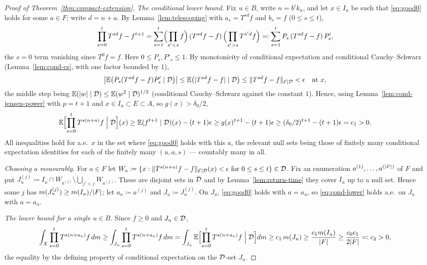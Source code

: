 \begin{proof}[Proof of Theorem~\ref{thm:compact-extension}]
  \emph{The conditional lower bound.}  Fix $u \in B$, write $n = b^ik_u$, and let
  $x \in I_u$ be such that \eqref{eq:good0} holds for some $a \in F$; write $d = n + a$.  By
  Lemma~\ref{lem:telescoping} with $a_s = T^{sd}f$ and $b_s = f$ ($0 \leq s \leq t$),
  \[
    \prod_{s=0}^{t} T^{sd}f - f^{t+1}
      = \sum_{s=1}^{t} \Bigl(\prod_{s'<s} f\Bigr)\,(T^{sd}f - f)\,\Bigl(\prod_{s'>s} T^{s'd}f\Bigr)
      \eqqcolon \sum_{s=1}^{t} P_s\,(T^{sd}f - f)\,P'_s ,
  \]
  the $s = 0$ term vanishing since $T^0f = f$.  Here $0 \leq P_s, P'_s \leq 1$.  By
  monotonicity of conditional expectation and conditional Cauchy--Schwarz
  (Lemma~\ref{lem:cond-cs}, with one factor bounded by $1$),
  \[
    \bigl\lvert \mathbb{E}\bigl( P_s(T^{sd}f - f)P'_s \mid \mathcal{D} \bigr) \bigr\rvert
      \leq \mathbb{E}\bigl( \lvert T^{sd}f - f \rvert \mid \mathcal{D} \bigr)
      \leq \lVert T^{sd}f - f \rVert_{\mathcal{E} \mid \mathcal{D}} < \epsilon \quad \text{at } x ,
  \]
  the middle step being $\mathbb{E}(\lvert w \rvert\mid\mathcal{D}) \leq \mathbb{E}(w^2\mid\mathcal{D})^{1/2}$ (conditional
  Cauchy--Schwarz against the constant $1$).  Hence, using Lemma~\ref{lem:cond-jensen-power}
  with $p = t+1$ and $x \in I_u \subset E \subset A$, so $g(x) > \delta_0/2$,
  \begin{equation}
    \label{eq:cond-lower}
    \mathbb{E}\Bigl[ \prod_{s=0}^{t} T^{s(n+a)}f \;\Big\vert\; \mathcal{D} \Bigr](x)
      \geq \mathbb{E}(f^{t+1}\mid\mathcal{D})(x) - (t+1)\epsilon \geq g(x)^{t+1} - (t+1)\epsilon
      \geq (\delta_0/2)^{t+1} - (t+1)\epsilon = c_1 > 0 .
  \end{equation}
  All inequalities hold for a.e.\ $x$ in the set where \eqref{eq:good0} holds with this $a$,
  the relevant null sets being those of finitely many conditional expectation identities for
  each of the finitely many $(u,a,s)$ --- countably many in all.

  \emph{Choosing $a$ measurably.}  For $a \in F$ let
  $W_a \coloneqq \{x : \lVert T^{s(n+a)}f - f \rVert_{\mathcal{E} \mid \mathcal{D}}(x) < \epsilon \text{ for } 0 \leq s \leq t\} \in \mathcal{D}$.
  Fix an enumeration $a^{(1)}, \dots, a^{(\lvert F \rvert)}$ of $F$ and put
  $J_u^{(j)} \coloneqq I_u \cap W_{a^{(j)}} \setminus \bigcup_{j' < j} W_{a^{(j')}}$.  These are
  disjoint sets in $\mathcal{D}$ and by Lemma~\ref{lem:return-time} they cover $I_u$ up to a null set.
  Hence some $j$ has $m(J_u^{(j)}) \geq m(I_u)/\lvert F \rvert$; let $a_u \coloneqq a^{(j)}$ and
  $J_u \coloneqq J_u^{(j)}$.  On $J_u$, \eqref{eq:good0} holds with $a = a_u$, so
  \eqref{eq:cond-lower} holds a.e.\ on $J_u$ with $a = a_u$.

  \emph{The lower bound for a single $u \in B$.}  Since $f \geq 0$ and $J_u \in \mathcal{D}$,
  \begin{equation}
    \label{eq:lowerbound}
    \int_X \prod_{s=0}^{t} T^{s(n+a_u)}f \, dm
      \geq \int_{J_u} \prod_{s=0}^{t} T^{s(n+a_u)}f \, dm
      = \int_{J_u} \mathbb{E}\Bigl[\prod_{s=0}^{t}T^{s(n+a_u)}f \;\Big\vert\; \mathcal{D}\Bigr] dm
      \geq c_1\, m(J_u) \geq \frac{c_1 m(I_u)}{\lvert F \rvert} \geq \frac{c_0 c_1}{2\lvert F \rvert} \eqqcolon c_2 > 0 ,
  \end{equation}
  the equality by the defining property of conditional expectation on the $\mathcal{D}$-set $J_u$.


\end{proof}
